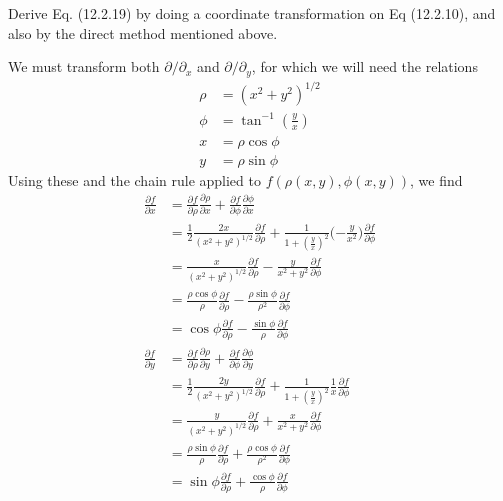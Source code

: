 \documentclass[../principles-of-quantum-mechanics.tex]{subfiles}
\begin{document}
\begin{questions}
	\question Derive Eq. (12.2.19) by doing a coordinate transformation on Eq (12.2.10), and also by the direct method mentioned above.
	\begin{solution}
		We must transform both $\partial/\partial_x$ and $\partial/\partial_y$, for which we will need the relations
		\begin{align*}
			\rho &= (x^2 + y^2)^{1/2} \\
			\phi &= \tan^{-1}(\tfrac{y}{x}) \\
			x &= \rho\cos\phi \\
			y &= \rho\sin\phi
		\end{align*}
		Using these and the chain rule applied to $f(\rho(x, y), \phi(x, y))$, we find
		\begin{align*}
			\frac{\partial f}{\partial x} &= \frac{\partial f}{\partial \rho}\frac{\partial \rho}{\partial x} + \frac{\partial f}{\partial \phi}\frac{\partial \phi}{\partial x} \\
			&= \frac{1}{2}\frac{2x}{(x^2 + y^2)^{1/2}}\frac{\partial f}{\partial \rho} + \frac{1}{1 + (\tfrac{y}{x})^2}\Big({-\frac{y}{x^2}}\Big)\frac{\partial f}{\partial \phi} \\
			&= \frac{x}{(x^2 + y^2)^{1/2}}\frac{\partial f}{\partial \rho} - \frac{y}{x^2 + y^2}\frac{\partial f}{\partial \phi} \\
			&= \frac{\rho\cos\phi}{\rho}\frac{\partial f}{\partial \rho} - \frac{\rho\sin\phi}{\rho^2}\frac{\partial f}{\partial \phi} \\
			&= \cos\phi\frac{\partial f}{\partial \rho} - \frac{\sin\phi}{\rho}\frac{\partial f}{\partial \phi} \\
			\frac{\partial f}{\partial y} &= \frac{\partial f}{\partial \rho}\frac{\partial \rho}{\partial y} + \frac{\partial f}{\partial \phi}\frac{\partial \phi}{\partial y} \\
			&= \frac{1}{2}\frac{2y}{(x^2 + y^2)^{1/2}}\frac{\partial f}{\partial \rho} + \frac{1}{1 + (\tfrac{y}{x})^2}\frac{1}{x}\frac{\partial f}{\partial \phi} \\
			&= \frac{y}{(x^2 + y^2)^{1/2}}\frac{\partial f}{\partial \rho} + \frac{x}{x^2 + y^2}\frac{\partial f}{\partial \phi} \\
			&= \frac{\rho\sin\phi}{\rho}\frac{\partial f}{\partial \rho} + \frac{\rho\cos\phi}{\rho^2}\frac{\partial f}{\partial \phi} \\
			&= \sin\phi\frac{\partial f}{\partial \rho} + \frac{\cos\phi}{\rho}\frac{\partial f}{\partial \phi} \\
		\end{align*}

\end{solution}
\end{questions}
\end{document}
